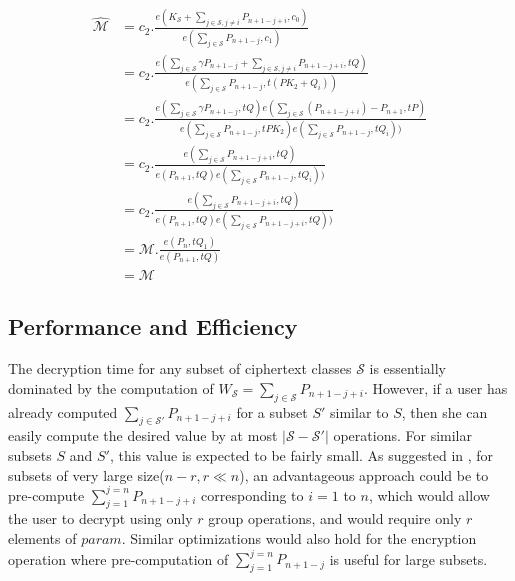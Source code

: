 \begin{scriptsize}
\begin{equation*}
\label{eq:correctness}
\begin{split}
 \hat{\mathcal{M}} &= c_2.\frac{{e}(K_{\mathcal{S}}+\sum_{j\in\mathcal{S},j\neq i}P_{n+1-j+i},c_0)}{{e}(\sum_{j\in\mathcal{S}}P_{n+1-j},c_1)}\\
  &= c_2.\frac{{e}(\sum_{j\in \mathcal{S}}{\gamma}P_{n+1-j} + \sum_{j\in\mathcal{S},j\neq i}P_{n+1-j+i},tQ)}{{e}(\sum_{j\in\mathcal{S}}P_{n+1-j},t(PK_2+Q_i))}\\
  &= c_2.\frac{{e}(\sum_{j\in \mathcal{S}}{\gamma}P_{n+1-j},tQ){e}(\sum_{j\in\mathcal{S}}(P_{n+1-j+i})-P_{n+1},tP)}{{e}(\sum_{j\in\mathcal{S}}P_{n+1-j},tPK_2){e}(\sum_{j\in\mathcal{S}}P_{n+1-j},tQ_i))}\\
  &= c_2.\frac{{e}(\sum_{j\in\mathcal{S}}P_{n+1-j+i},tQ)}{{e}(P_{n+1},tQ){e}(\sum_{j\in\mathcal{S}}P_{n+1-j},tQ_i))}\\
  &= c_2.\frac{{e}(\sum_{j\in\mathcal{S}}P_{n+1-j+i},tQ)}{{e}(P_{n+1},tQ){e}(\sum_{j\in\mathcal{S}}P_{n+1-j+i},tQ))}\\
  &= \mathcal{M}.\frac{{e}(P_n,tQ_1)}{{e}(P_{n+1},tQ)}\\
  &= \mathcal{M}
\end{split}  
\end{equation*}
\end{scriptsize}


\subsection{Performance and Efficiency}
\label{subsec:perf_basic}
The decryption time for any subset of ciphertext classes $\mathcal{S}$ is essentially dominated by the computation of $W_{\mathcal{S}}=\sum_{j\in\mathcal{S}}P_{n+1-j+i}$. However, if a user has already computed $\sum_{j\in\mathcal{S}'}P_{n+1-j+i}$ for a subset $S'$ similar to $S$, then she can easily compute the desired value by at most $|\mathcal{S}-\mathcal{S}'|$ operations. For similar subsets $S$ and $S'$, this value is expected to be fairly small. As suggested in \cite{boneh2005collusion}, for subsets of very large size($n-r, r\ll n$), an advantageous approach could be to pre-compute $\sum_{j=1}^{j=n}P_{n+1-j+i}$ corresponding to $i=1$ to $n$, which would allow the user to decrypt using only $r$ group operations, and would require only $r$ elements of $param$. Similar optimizations would also hold for the encryption operation where pre-computation of  $\sum_{j=1}^{j=n}P_{n+1-j}$ is useful for large subsets.



